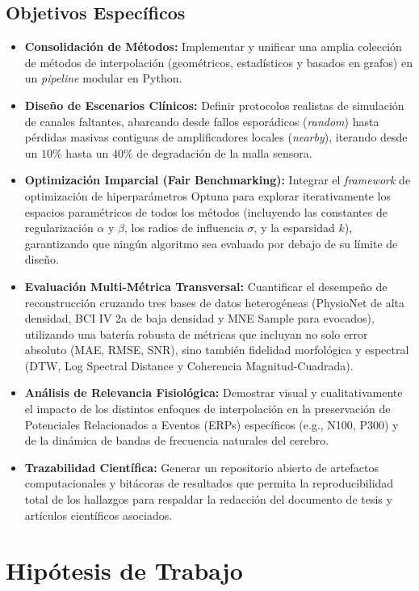 \subsection{Objetivos Específicos}
\begin{itemize}
    \item \textbf{Consolidación de Métodos:} Implementar y unificar una amplia colección de métodos de interpolación (geométricos, estadísticos y basados en grafos) en un \textit{pipeline} modular en Python.
    \item \textbf{Diseño de Escenarios Clínicos:} Definir protocolos realistas de simulación de canales faltantes, abarcando desde fallos esporádicos (\textit{random}) hasta pérdidas masivas contiguas de amplificadores locales (\textit{nearby}), iterando desde un $10\%$ hasta un $40\%$ de degradación de la malla sensora.
    \item \textbf{Optimización Imparcial (Fair Benchmarking):} Integrar el \textit{framework} de optimización de hiperparámetros Optuna para explorar iterativamente los espacios paramétricos de todos los métodos (incluyendo las constantes de regularización $\alpha$ y $\beta$, los radios de influencia $\sigma$, y la esparsidad $k$), garantizando que ningún algoritmo sea evaluado por debajo de su límite de diseño.
    \item \textbf{Evaluación Multi-Métrica Transversal:} Cuantificar el desempeño de reconstrucción cruzando tres bases de datos heterogéneas (PhysioNet de alta densidad, BCI IV 2a de baja densidad y MNE Sample para evocados), utilizando una batería robusta de métricas que incluyan no solo error absoluto (MAE, RMSE, SNR), sino también fidelidad morfológica y espectral (DTW, Log Spectral Distance y Coherencia Magnitud-Cuadrada).
    \item \textbf{Análisis de Relevancia Fisiológica:} Demostrar visual y cualitativamente el impacto de los distintos enfoques de interpolación en la preservación de Potenciales Relacionados a Eventos (ERPs) específicos (e.g., N100, P300) y de la dinámica de bandas de frecuencia naturales del cerebro.
    \item \textbf{Trazabilidad Científica:} Generar un repositorio abierto de artefactos computacionales y bitácoras de resultados que permita la reproducibilidad total de los hallazgos para respaldar la redacción del documento de tesis y artículos científicos asociados.
\end{itemize}

\section{Hipótesis de Trabajo}

